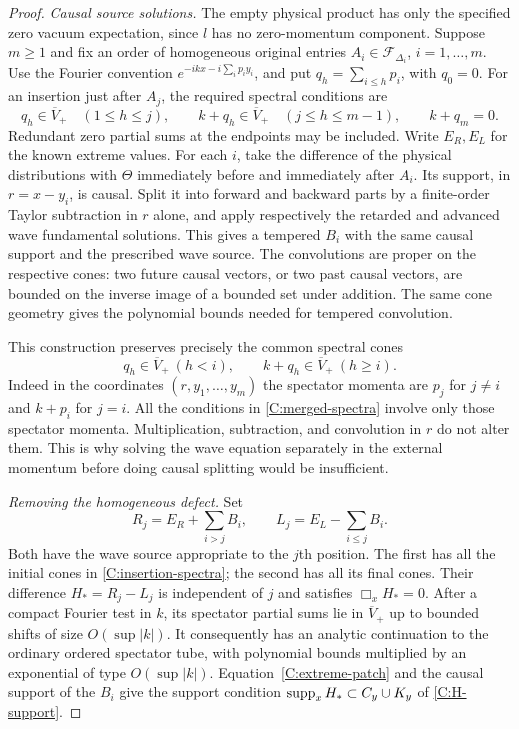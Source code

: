 \begin{proof}
\emph{Causal source solutions.}
The empty physical product has only the specified zero vacuum
expectation, since $l$ has no zero-momentum component. Suppose
$m\ge1$ and fix an order of homogeneous original entries
$A_i\in\mathcal F_{\Delta_i}$, $i=1,\ldots,m$.
Use the Fourier convention
$e^{-ikx-i\sum_i p_i y_i}$, and put $q_h=\sum_{i\le h}p_i$, with
$q_0=0$. For an insertion just after $A_j$, the required spectral
conditions are
\begin{equation}\label{C:insertion-spectra}
 q_h\in\overline V_+\quad(1\le h\le j),
 \qquad k+q_h\in\overline V_+\quad(j\le h\le m-1),
 \qquad k+q_m=0.
\end{equation}
Redundant zero partial sums at the endpoints may be included. Write
$E_R,E_L$ for the known extreme values. For each $i$, take the
difference of the physical distributions with $\Theta$ immediately
before and immediately after $A_i$. Its support, in $r=x-y_i$, is
causal. Split it into forward and backward parts by a finite-order
Taylor subtraction in $r$ alone, and apply respectively the retarded
and advanced wave fundamental solutions. This gives a tempered $B_i$
with the same causal support and the prescribed wave source. The
convolutions are proper on the respective cones: two future causal
vectors, or two past causal vectors, are bounded on the inverse image
of a bounded set under addition. The same cone geometry gives the
polynomial bounds needed for tempered convolution.

This construction preserves precisely the common spectral cones
\begin{equation}\label{C:merged-spectra}
 q_h\in\overline V_+\ (h<i),\qquad
 k+q_h\in\overline V_+\ (h\ge i).
\end{equation}
Indeed in the coordinates $(r,y_1,\ldots,y_m)$ the spectator momenta
are $p_j$ for $j\ne i$ and $k+p_i$ for $j=i$.
All the conditions in \eqref{C:merged-spectra} involve only those
spectator momenta. Multiplication, subtraction, and convolution in $r$
do not alter them. This is why solving the wave equation separately
in the external momentum before doing causal splitting would be
insufficient.

\emph{Removing the homogeneous defect.}
Set
\[
 R_j=E_R+\sum_{i>j}B_i,\qquad
 L_j=E_L-\sum_{i\le j}B_i.
\]
Both have the wave source appropriate to the $j$th position. The first
has all the initial cones in \eqref{C:insertion-spectra}; the second
has all its final cones. Their difference
$H_*=R_j-L_j$ is independent of $j$ and satisfies $\Box_xH_*=0$.
After a compact Fourier test in $k$, its spectator partial sums lie in
$\overline V_+$ up to bounded shifts of size $O(\sup|k|)$.
It consequently has an analytic continuation to the ordinary ordered
spectator tube, with polynomial bounds multiplied by an exponential
of type $O(\sup|k|)$. Equation~\eqref{C:extreme-patch} and the causal
support of the $B_i$ give
the support condition $\operatorname{supp}_xH_*\subset C_y\cup K_y$ of
\eqref{C:H-support}.


\end{proof}
